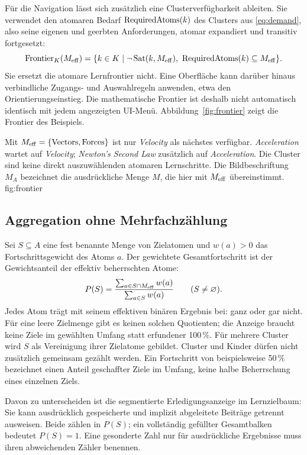 Für die Navigation lässt sich zusätzlich eine Clusterverfügbarkeit
ableiten. Sie verwendet den atomaren Bedarf $\operatorname{RequiredAtoms}(k)$ des Clusters aus
\eqref{eq:demand}, also seine eigenen und geerbten Anforderungen, atomar
expandiert und transitiv fortgesetzt:
\begin{equation}
 \operatorname{Frontier}_K(M_{\mathrm{eff}})=\{k\in K\mid\neg\operatorname{Sat}(k,M_{\mathrm{eff}}),\ \operatorname{RequiredAtoms}(k)\subseteq M_{\mathrm{eff}}\}.
\end{equation}
Sie ersetzt die atomare Lernfrontier nicht. Eine Oberfläche kann darüber
hinaus verbindliche Zugangs- und Auswahlregeln anwenden, etwa den
Orientierungseinstieg. Die mathematische Frontier ist deshalb nicht
automatisch identisch mit jedem angezeigten UI-Menü.
Abbildung~\ref{fig:frontier} zeigt die Frontier des Beispiels.

{Mit $M_{\mathrm{eff}}=\{\text{Vectors},\text{Forces}\}$ ist nur \emph{Velocity} als
nächstes verfügbar. \emph{Acceleration} wartet auf \emph{Velocity};
\emph{Newton's Second Law} zusätzlich auf \emph{Acceleration}.
Die Cluster sind keine direkt auszuwählenden atomaren Lernschritte. Die
Bildbeschriftung $M_A$ bezeichnet die ausdrückliche Menge $M$, die hier mit
$M_{\mathrm{eff}}$ übereinstimmt.}
{fig:frontier}

\subsection{Aggregation ohne Mehrfachzählung}
Sei $S\subseteq A$ eine fest benannte Menge von Zielatomen und
$w(a)>0$ das Fortschrittsgewicht des Atoms $a$. Der gewichtete
Gesamtfortschritt ist der Gewichtsanteil der effektiv beherrschten Atome:
\begin{equation}
 P(S)=\frac{\sum_{a\in S\cap M_{\mathrm{eff}}}w(a)}{\sum_{a\in S}w(a)}\qquad(S\ne\varnothing).
\end{equation}
Jedes Atom trägt mit seinem effektiven binären Ergebnis bei: ganz oder gar
nicht. Für eine leere Zielmenge gibt es keinen solchen Quotienten; die
Anzeige braucht \glqq keine Ziele im gewählten Umfang\grqq{} statt
erfundener 100\,\%.
Für mehrere Cluster wird $S$ als Vereinigung ihrer Zielatome gebildet.
Cluster und Kinder dürfen nicht zusätzlich gemeinsam gezählt werden.
Ein Fortschritt von beispielsweise 50\,\% bezeichnet einen Anteil
geschaffter Ziele im Umfang, keine halbe Beherrschung eines einzelnen Ziels.

Davon zu unterscheiden ist die segmentierte Erledigungsanzeige im
Lernzielbaum:
Sie kann ausdrücklich gespeicherte und implizit abgeleitete Beiträge
getrennt ausweisen. Beide zählen in $P(S)$; ein vollständig gefüllter
Gesamtbalken bedeutet $P(S)=1$. Eine gesonderte Zahl nur für ausdrückliche
Ergebnisse muss ihren abweichenden Zähler benennen.

